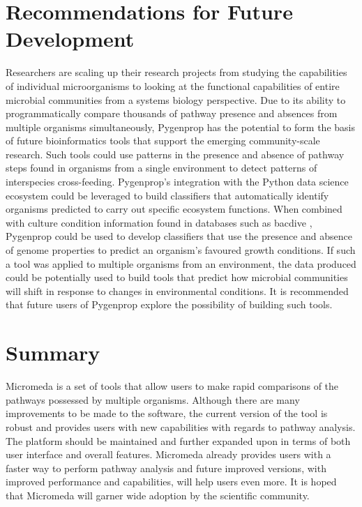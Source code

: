 \section{Recommendations for Future Development}

Researchers are scaling up their research projects from studying the 
capabilities of individual microorganisms to looking at the functional 
capabilities of entire microbial communities from a systems biology perspective. 
Due to its ability to programmatically compare thousands of pathway presence and 
absences from multiple organisms simultaneously, Pygenprop has the potential to 
form the basis of future bioinformatics tools that support the emerging 
community-scale research. Such tools could use patterns in the presence and 
absence of pathway steps found in organisms from a single environment to detect 
patterns of interspecies cross-feeding. Pygenprop's integration with the Python 
data science ecosystem could be leveraged to build classifiers that 
automatically identify organisms predicted to carry out specific ecosystem 
functions. When combined with culture condition information found in databases 
such as \gls{bacdive} \cite{reimer2018bac}, Pygenprop could be used to develop 
classifiers that use the presence and absence of genome properties to predict an 
organism's favoured growth conditions. If such a tool was applied to multiple 
organisms from an environment, the data produced could be potentially used to 
build tools that predict how microbial communities will shift in response to 
changes in environmental conditions. It is recommended that future users of 
Pygenprop explore the possibility of building such tools.

\section{Summary}

Micromeda is a set of tools that allow users to make rapid comparisons of the 
pathways possessed by multiple organisms. Although there are many improvements 
to be made to the software, the current version of the tool is robust and 
provides users with new capabilities with regards to pathway analysis. The 
platform should be maintained and further expanded upon in terms of both user 
interface and overall features. Micromeda already provides users with a faster 
way to perform pathway analysis and future improved versions, with improved 
performance and capabilities, will help users even more. It is hoped that 
Micromeda will garner wide adoption by the scientific community.
